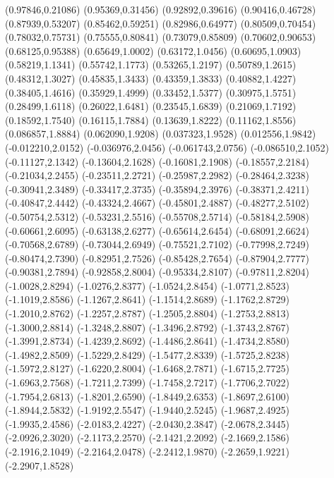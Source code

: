 \documentclass[11pt]{report}
\begin{document}
\begin{center}
  \psccurve[linecolor=blue]
  (0.97846,0.21086)
  (0.95369,0.31456)
  (0.92892,0.39616)
  (0.90416,0.46728)
  (0.87939,0.53207)
  (0.85462,0.59251)
  (0.82986,0.64977)
  (0.80509,0.70454)
  (0.78032,0.75731)
  (0.75555,0.80841)
  (0.73079,0.85809)
  (0.70602,0.90653)
  (0.68125,0.95388)
  (0.65649,1.0002)
  (0.63172,1.0456)
  (0.60695,1.0903)
  (0.58219,1.1341)
  (0.55742,1.1773)
  (0.53265,1.2197)
  (0.50789,1.2615)
  (0.48312,1.3027)
  (0.45835,1.3433)
  (0.43359,1.3833)
  (0.40882,1.4227)
  (0.38405,1.4616)
  (0.35929,1.4999)
  (0.33452,1.5377)
  (0.30975,1.5751)
  (0.28499,1.6118)
  (0.26022,1.6481)
  (0.23545,1.6839)
  (0.21069,1.7192)
  (0.18592,1.7540)
  (0.16115,1.7884)
  (0.13639,1.8222)
  (0.11162,1.8556)
  (0.086857,1.8884)
  (0.062090,1.9208)
  (0.037323,1.9528)
  (0.012556,1.9842)
  (-0.012210,2.0152)
  (-0.036976,2.0456)
  (-0.061743,2.0756)
  (-0.086510,2.1052)
  (-0.11127,2.1342)
  (-0.13604,2.1628)
  (-0.16081,2.1908)
  (-0.18557,2.2184)
  (-0.21034,2.2455)
  (-0.23511,2.2721)
  (-0.25987,2.2982)
  (-0.28464,2.3238)
  (-0.30941,2.3489)
  (-0.33417,2.3735)
  (-0.35894,2.3976)
  (-0.38371,2.4211)
  (-0.40847,2.4442)
  (-0.43324,2.4667)
  (-0.45801,2.4887)
  (-0.48277,2.5102)
  (-0.50754,2.5312)
  (-0.53231,2.5516)
  (-0.55708,2.5714)
  (-0.58184,2.5908)
  (-0.60661,2.6095)
  (-0.63138,2.6277)
  (-0.65614,2.6454)
  (-0.68091,2.6624)
  (-0.70568,2.6789)
  (-0.73044,2.6949)
  (-0.75521,2.7102)
  (-0.77998,2.7249)
  (-0.80474,2.7390)
  (-0.82951,2.7526)
  (-0.85428,2.7654)
  (-0.87904,2.7777)
  (-0.90381,2.7894)
  (-0.92858,2.8004)
  (-0.95334,2.8107)
  (-0.97811,2.8204)
  (-1.0028,2.8294)
  (-1.0276,2.8377)
  (-1.0524,2.8454)
  (-1.0771,2.8523)
  (-1.1019,2.8586)
  (-1.1267,2.8641)
  (-1.1514,2.8689)
  (-1.1762,2.8729)
  (-1.2010,2.8762)
  (-1.2257,2.8787)
  (-1.2505,2.8804)
  (-1.2753,2.8813)
  (-1.3000,2.8814)
  (-1.3248,2.8807)
  (-1.3496,2.8792)
  (-1.3743,2.8767)
  (-1.3991,2.8734)
  (-1.4239,2.8692)
  (-1.4486,2.8641)
  (-1.4734,2.8580)
  (-1.4982,2.8509)
  (-1.5229,2.8429)
  (-1.5477,2.8339)
  (-1.5725,2.8238)
  (-1.5972,2.8127)
  (-1.6220,2.8004)
  (-1.6468,2.7871)
  (-1.6715,2.7725)
  (-1.6963,2.7568)
  (-1.7211,2.7399)
  (-1.7458,2.7217)
  (-1.7706,2.7022)
  (-1.7954,2.6813)
  (-1.8201,2.6590)
  (-1.8449,2.6353)
  (-1.8697,2.6100)
  (-1.8944,2.5832)
  (-1.9192,2.5547)
  (-1.9440,2.5245)
  (-1.9687,2.4925)
  (-1.9935,2.4586)
  (-2.0183,2.4227)
  (-2.0430,2.3847)
  (-2.0678,2.3445)
  (-2.0926,2.3020)
  (-2.1173,2.2570)
  (-2.1421,2.2092)
  (-2.1669,2.1586)
  (-2.1916,2.1049)
  (-2.2164,2.0478)
  (-2.2412,1.9870)
  (-2.2659,1.9221)
  (-2.2907,1.8528)

\end{center}
\end{document}
